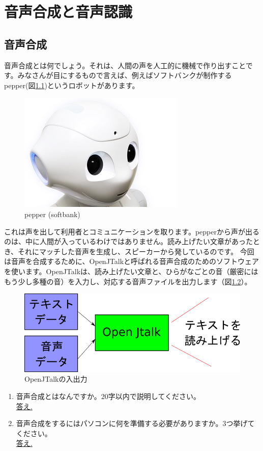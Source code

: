\chapter{音声合成と音声認識}
\section{音声合成}
音声合成とは何でしょう。それは、人間の声を人工的に機械で作り出すことです。みなさんが目にするもので言えば、例えばソフトバンクが制作するpepper(図\ref{pepper})というロボットがあります。

\begin{figure}[H]
\begin{center}
    \includegraphics[width=0.5\linewidth]{images/chap06/text06-img001.jpg}
    \caption{pepper (softbank)}
    \label{pepper}
\end{center}
\end{figure}

これは声を出して利用者とコミュニケーションを取ります。pepperから声が出るのは、中に人間が入っているわけではありません。読み上げたい文章があったとき、それにマッチした音声を生成し、スピーカーから発しているのです。
今回は音声を合成するために、OpenJTalkと呼ばれる音声合成のためのソフトウェアを使います。OpenJTalkは、読み上げたい文章と、ひらがなごとの音（厳密にはもう少し多種の音）を入力し、対応する音声ファイルを出力します（図\ref{OpenJTalkの入出力}）。

\begin{figure}[H]
\begin{center}
    \includegraphics[width=\linewidth]{images/chap06/text06-img011.png}
    \caption{OpenJTalkの入出力}
    \label{OpenJTalkの入出力}
\end{center}
\end{figure}

\begin{tcolorbox}[title=\useOmetoi]
\begin{enumerate}
\item 音声合成とはなんですか。20字以内で説明してください。\\
\underline{答え.\hspace{0.8\linewidth}}
\item 音声合成をするにはパソコンに何を準備する必要がありますか。3つ挙げてください。\\
\underline{答え.\hspace{0.8\linewidth}}
\end{enumerate}
\end{tcolorbox}